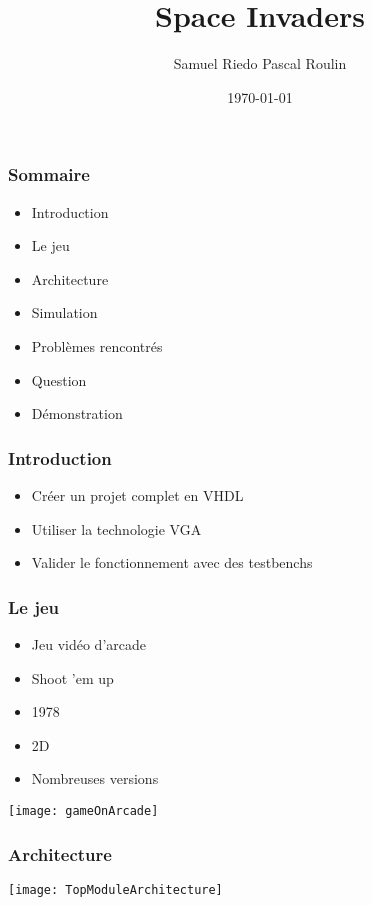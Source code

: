\documentclass[serif,mathserif, french]{beamer}
\author[Samuel Riedo \& Pascal Roulin]{Samuel Riedo \quad Pascal Roulin}
\title[Space Invaders\hspace{2em}\insertframenumber/\inserttotalframenumber]{Space Invaders}
\date{\today}
\institute{Justice League of VHDL}
\begin{document}
\maketitle


\begin{frame}
  \frametitle{Sommaire}
  \begin{itemize}
  \item Introduction
  \item Le jeu
  \item Architecture
  \item Simulation
  \item Problèmes rencontrés
  \item Question
  \item Démonstration
  \end{itemize}
\end{frame}

\begin{frame}
  \frametitle{Introduction}
  \begin{itemize}
  \item Créer un projet complet en VHDL
  \item Utiliser la technologie VGA
  \item Valider le fonctionnement avec des testbenchs
  \end{itemize}
\end{frame}

\begin{frame}
  \frametitle{Le jeu}
  \begin{itemize}
  \item Jeu vidéo d'arcade
  \item Shoot 'em up
  \item 1978
  \item 2D
  \item Nombreuses versions
  \end{itemize}
  \begin{center}
  \texttt{[image: gameOnArcade]}
  \end{center}
\end{frame}

\begin{frame}
  \frametitle{Architecture}
  \begin{center}
      \texttt{[image: TopModuleArchitecture]}
      \end{center}
\end{frame}
\end{document}
